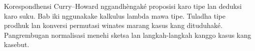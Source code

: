 \documentclass[../../../include/open-logic-chapter]{subfiles}
\begin{document}

\begin{editorial}
Korespondhensi Curry--Howard nggandhèngaké proposisi karo tipe lan deduksi karo suku. Bab iki nggunakake kalkulus lambda mawa tipe. Tuladha tipe prodhuk lan konversi permutasi winates marang kasus kang dituduhaké. Pangrembugan normalisasi menehi sketsa lan langkah-langkah kanggo kasus kang kasebut.
\end{editorial}


\OLEndChapterHook
\end{document}
